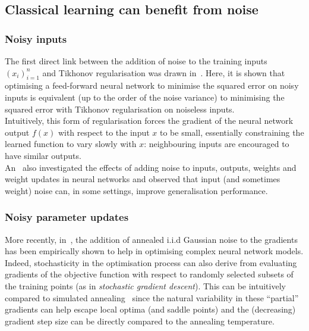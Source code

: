 \documentclass[a4paper, 11pt]{article}
\begin{document}
\subsection*{Classical learning can benefit from noise}

\subsubsection*{Noisy inputs}

The first direct link between the addition of noise to the training inputs \((x_i)_{i=1}^n\) and Tikhonov regularisation was drawn in~\cite{bishop1995training}. Here, it is shown that optimising a feed-forward neural network to minimise the squared error on noisy inputs is equivalent (up to the order of the noise variance) to minimising the squared error with Tikhonov regularisation on noiseless inputs. \\

Intuitively, this form of regularisation forces the gradient of the neural network output \(f(x)\) with respect to the input \(x\) to be small, essentially constraining the learned function to vary slowly with \(x\): neighbouring inputs are encouraged to have similar outputs. \\

An~\cite{an1996effects} also investigated the effects of adding noise to inputs, outputs, weights and weight updates in neural networks and observed that input (and sometimes weight) noise can, in some settings, improve generalisation performance. 

\subsubsection*{Noisy parameter updates}

More recently, in~\cite{neelakantan2015adding}, the addition of annealed i.i.d Gaussian noise to the gradients has been empirically shown to help in optimising complex neural network models.
Indeed, stochasticity in the optimisation process can also derive from evaluating gradients of the objective function with respect to randomly selected subsets of the training points (as in \emph{stochastic gradient descent}). This can be intuitively compared to simulated annealing~\cite{bottou1991stochastic} since the natural variability in these ``partial'' gradients can help escape local optima (and saddle points) and the (decreasing) gradient step size can be directly compared to the annealing temperature.\\
\end{document}
